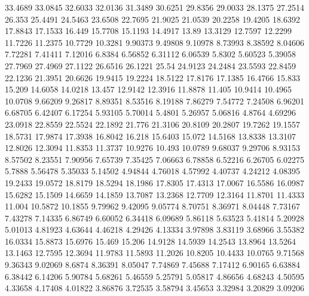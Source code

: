 33.4689      33.0845      32.6033      32.0136      31.3489      30.6251      29.8356      29.0033      28.1375      27.2514      26.353      25.4491      24.5463      23.6508      22.7695      21.9025      21.0539      20.2258      19.4205      18.6392      17.8843      17.1533      16.449      15.7708      15.1193      14.4917      13.89      13.3129      12.7597      12.2299      11.7226      11.2375      10.7729      10.3281      9.90373      9.49808      9.10978      8.73993      8.38592      8.04606      7.72281      7.41411      7.12016      6.8384      6.56852      6.31112      6.06539      5.8302      5.60523      5.39058      
27.7969      27.4969      27.1122      26.6516      26.1221      25.54      24.9123      24.2484      23.5593      22.8459      22.1236      21.3951      20.6626      19.9415      19.2224      18.5122      17.8176      17.1385      16.4766      15.833      15.209      14.6058      14.0218      13.457      12.9142      12.3916      11.8878      11.405      10.9414      10.4965      10.0708      9.66209      9.26817      8.89351      8.53516      8.19188      7.86279      7.54772      7.24508      6.96201      6.68705      6.42407      6.17254      5.93105      5.70014      5.4801      5.26957      5.06816      4.8764      4.69296      
23.0918      22.8559      22.5524      22.1892      21.776      21.3106      20.8109      20.2807      19.7262      19.1557      18.5731      17.9874      17.3938      16.8042      16.218      15.6403      15.072      14.5168      13.8338      13.3107      12.8026      12.3094      11.8353      11.3737      10.9276      10.493      10.0789      9.68037      9.29706      8.93153      8.57502      8.23551      7.90956      7.65739      7.35425      7.06663      6.78858      6.52216      6.26705      6.02275      5.7888      5.56478      5.35033      5.14502      4.94844      4.76018      4.57992      4.40737      4.24212      4.08395      
19.2433      19.0572      18.8179      18.5294      18.1986      17.8305      17.4313      17.0067      16.5586      16.0987      15.6282      15.1509      14.6659      14.1859      13.7087      13.2368      12.7709      12.3164      11.8701      11.4333      11.004      10.5872      10.1855      9.79962      9.42095      9.05774      8.70751      8.36971      8.04448      7.73167      7.43278      7.14335      6.86749      6.60052      6.34418      6.09689      5.86118      5.63523      5.41814      5.20928      5.01013      4.81923      4.63644      4.46218      4.29426      4.13334      3.97898      3.83119      3.68966      3.55382      
16.0334      15.8873      15.6976      15.469      15.206      14.9128      14.5939      14.2543      13.8964      13.5264      13.1463      12.7595      12.3694      11.9783      11.5893      11.2026      10.8205      10.4433      10.0765      9.71568      9.36343      9.02069      8.6874      8.36391      8.05047      7.74869      7.45688      7.17412      6.90165      6.63884      6.38442      6.14206      5.90784      5.68261      5.46559      5.25791      5.05817      4.86656      4.68243      4.50595      4.33658      4.17408      4.01822      3.86876      3.72535      3.58794      3.45653      3.32984      3.20829      3.09206      
